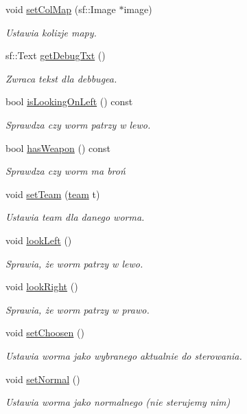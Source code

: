 \begin{DoxyCompactItemize}
void \mbox{\hyperlink{class_worm_af851e558c46b33b245b96a43bb2e5c56}{set\+Col\+Map}} (sf\+::\+Image $\ast$image)
\begin{DoxyCompactList}\small\item\em Ustawia kolizje mapy. \end{DoxyCompactList}\item 
sf\+::\+Text \mbox{\hyperlink{class_worm_afed2a8beb878659d49977440293ef884}{get\+Debug\+Txt}} ()
\begin{DoxyCompactList}\small\item\em Zwraca tekst dla debbuge\textquotesingle{}a. \end{DoxyCompactList}\item 
bool \mbox{\hyperlink{class_worm_a3a90a91ddbe99e67f48e54a57d12b5c7}{is\+Looking\+On\+Left}} () const
\begin{DoxyCompactList}\small\item\em Sprawdza czy worm patrzy w lewo. \end{DoxyCompactList}\item 
bool \mbox{\hyperlink{class_worm_a15fc66d733ecfe886495910f591d1a34}{has\+Weapon}} () const
\begin{DoxyCompactList}\small\item\em Sprawdza czy worm ma broń \end{DoxyCompactList}\item 
void \mbox{\hyperlink{class_worm_a8eb6b3e55c2e6cb7c87b1593f34dac52}{set\+Team}} (\mbox{\hyperlink{_worm_8h_ae79581ee1998185d7cb41ab84352b97e}{team}} t)
\begin{DoxyCompactList}\small\item\em Ustawia team dla danego worma. \end{DoxyCompactList}\item 
void \mbox{\hyperlink{class_worm_a84fbbdac67be083a5492bf38cf83544b}{look\+Left}} ()
\begin{DoxyCompactList}\small\item\em Sprawia, że worm patrzy w lewo. \end{DoxyCompactList}\item 
void \mbox{\hyperlink{class_worm_a4dbc714c26c5b09a94bd53f10172b4c1}{look\+Right}} ()
\begin{DoxyCompactList}\small\item\em Sprawia, że worm patrzy w prawo. \end{DoxyCompactList}\item 
void \mbox{\hyperlink{class_worm_ac5daf6e0926f483415886c5ae297714a}{set\+Choosen}} ()
\begin{DoxyCompactList}\small\item\em Ustawia worma jako wybranego aktualnie do sterowania. \end{DoxyCompactList}\item 
void \mbox{\hyperlink{class_worm_ab316cd13ecdfe9696e28687bfce47a4c}{set\+Normal}} ()
\begin{DoxyCompactList}\small\item\em Ustawia worma jako normalnego (nie sterujemy nim) \end{DoxyCompactList}\end{DoxyCompactItemize}
